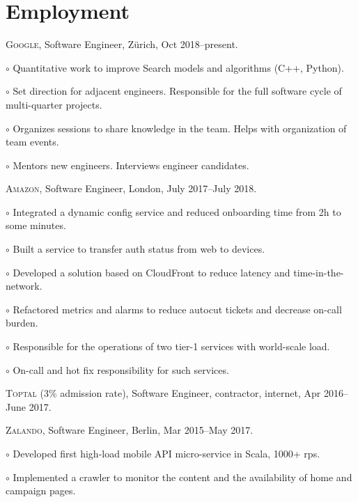 \documentclass[letterpaper]{article}
\renewenvironment{itemize}{
  \begin{list}{}{
    \setlength{\leftmargin}{1.5em}
  }
}{
  \end{list}
}
\newenvironment{no-indent-itemize}{
  \begin{list}{}{
    \setlength{\leftmargin}{0em}
  }
}{
  \end{list}
}
\def\bullet{$\circ$\xspace}
\begin{document}
\section*{Employment}
\begin{no-indent-itemize}
  \item \textsc{Google}, Software Engineer, Z\"urich, Oct 2018--present.
  \begin{itemize}
    \item\bullet Quantitative work to improve Search models and algorithms (C++, Python). 
    \item\bullet Set direction for adjacent engineers. Responsible for the full software cycle of multi-quarter projects.
    \item\bullet Organizes sessions to share knowledge in the team. Helps with organization of team events.
    \item\bullet Mentors new engineers. Interviews engineer candidates.
  \end{itemize}
  \item \textsc{Amazon}, Software Engineer, London, July 2017--July 2018.
  \begin{itemize}
    \item\bullet Integrated a dynamic config service and reduced onboarding time from 2h to some minutes.
    \item\bullet Built a service to transfer auth status from web to devices.
    \item\bullet Developed a solution based on CloudFront to reduce latency and time-in-the-network.
    \item\bullet Refactored metrics and alarms to reduce autocut tickets and decrease on-call burden.
    \item\bullet Responsible for the operations of two tier-1 services with world-scale load.
    \item\bullet On-call and hot fix responsibility for such services.
  \end{itemize}
  \item \textsc{Toptal} (3\% admission rate), Software Engineer, contractor, internet, Apr 2016--June 2017.
  \item \textsc{Zalando}, Software Engineer, Berlin, Mar 2015--May 2017.
  \begin{itemize}
    \item\bullet Developed first high-load mobile API micro-service in Scala, 1000+ rps.
    \item\bullet Implemented a crawler to monitor the content and the availability of home and campaign pages.

\end{itemize}
\end{no-indent-itemize}
\end{document}
